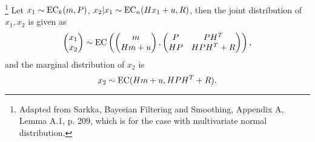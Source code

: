\begin{lemma} \label{L:ell_joint}
\footnote{Adapted from Sarkka, Bayesian Filtering and Smoothing, Appendix A, 
	Lemma A.1, p. 209, which is for the case with multivariate normal
	distribution.}
Let $x_1\sim \operatorname*{EC}_k(m,P)$, $x_2|x_1 \sim \operatorname*{EC}_n (H x_1 + u, R)$, then the joint
distribution of $x_1,x_2$ is given as
\[
  \begin{pmatrix}
    x_1 \\
    x_2 \\
  \end{pmatrix}
  \sim
  \operatorname*{EC} 
    \left(
	  \begin{pmatrix}
        m \\
        Hm+u \\
      \end{pmatrix},
	  \begin{pmatrix}
        P    & PH^T \\
        HP   & HPH^T + R \\
      \end{pmatrix}
    \right),
\]
and the marginal distribution of $x_2$ is 
\[
  x_2\sim \operatorname*{EC} (Hm + u, HPH^T + R).
\]
\end{lemma}
